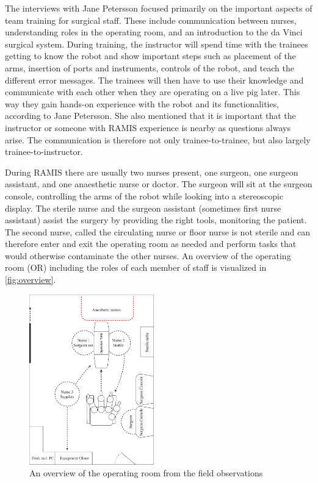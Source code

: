 \documentclass[conference]{IEEEtran}
\begin{document}
The interviews with Jane Petersson focused primarily on the important aspects of team training for surgical staff. These include communication between nurses, understanding roles in the operating room, and an introduction to the da Vinci surgical system. During training, the instructor will spend time with the trainees getting to know the robot and show important steps such as placement of the arms, insertion of ports and instruments, controls of the robot, and teach the different error messages. The trainees will then have to use their knowledge and communicate with each other when they are operating on a live pig later. This way they gain hands-on experience with the robot and its functionalities, according to Jane Petersson. She also mentioned that it is important that the instructor or someone with RAMIS experience is nearby as questions always arise. The communication is therefore not only trainee-to-trainee, but also largely trainee-to-instructor.

During RAMIS there are usually two nurses present, one surgeon, one surgeon assistant, and one anaesthetic nurse or doctor. The surgeon will sit at the surgeon console, controlling the arms of the robot while looking into a stereoscopic display. The sterile nurse and the surgeon assistant (sometimes first nurse assistant) assist the surgery by providing the right tools, monitoring the patient. The second nurse, called the circulating nurse or floor nurse is not sterile and can therefore enter and exit the operating room as needed and perform tasks that would otherwise contaminate the other nurses. An overview of the operating room (OR) including the roles of each member of staff is visualized in \autoref{fig:overview}.

\begin{figure}
 \centering
 \includegraphics[width=0.48\textwidth]{Figures/overview.pdf}
 \caption{An overview of the operating room from the field observations}
 \label{fig:overview}
 \end{figure}
 
\end{document}
